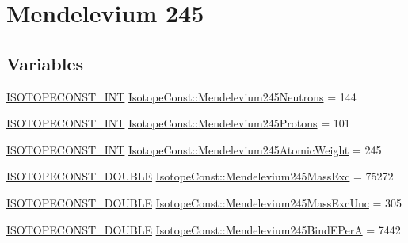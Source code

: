\hypertarget{group___isotope_const-_mendelevium-_md245}{}\section{Mendelevium 245}
\label{group___isotope_const-_mendelevium-_md245}
\subsection*{Variables}
\begin{DoxyCompactItemize}
\item 
\mbox{\hyperlink{group___isotope_const-_macros_ga5f18360b3e99483a35c32d789e62621c}{I\+S\+O\+T\+O\+P\+E\+C\+O\+N\+S\+T\+\_\+\+I\+NT}} \mbox{\hyperlink{group___isotope_const-_mendelevium-_md245_gaf6d702b3f6d6c8c738aa31ececd68d5a}{Isotope\+Const\+::\+Mendelevium245\+Neutrons}} = 144
\item 
\mbox{\hyperlink{group___isotope_const-_macros_ga5f18360b3e99483a35c32d789e62621c}{I\+S\+O\+T\+O\+P\+E\+C\+O\+N\+S\+T\+\_\+\+I\+NT}} \mbox{\hyperlink{group___isotope_const-_mendelevium-_md245_ga973fd4597419b4811d2b14048e3ec661}{Isotope\+Const\+::\+Mendelevium245\+Protons}} = 101
\item 
\mbox{\hyperlink{group___isotope_const-_macros_ga5f18360b3e99483a35c32d789e62621c}{I\+S\+O\+T\+O\+P\+E\+C\+O\+N\+S\+T\+\_\+\+I\+NT}} \mbox{\hyperlink{group___isotope_const-_mendelevium-_md245_gaf616d365d0a048e089cbad421ae89f7b}{Isotope\+Const\+::\+Mendelevium245\+Atomic\+Weight}} = 245
\item 
\mbox{\hyperlink{group___isotope_const-_macros_ga8f45a7272ce02c0b4c65c44636ed719a}{I\+S\+O\+T\+O\+P\+E\+C\+O\+N\+S\+T\+\_\+\+D\+O\+U\+B\+LE}} \mbox{\hyperlink{group___isotope_const-_mendelevium-_md245_gabc759b583a61c4e429667389740dde7f}{Isotope\+Const\+::\+Mendelevium245\+Mass\+Exc}} = 75272
\item 
\mbox{\hyperlink{group___isotope_const-_macros_ga8f45a7272ce02c0b4c65c44636ed719a}{I\+S\+O\+T\+O\+P\+E\+C\+O\+N\+S\+T\+\_\+\+D\+O\+U\+B\+LE}} \mbox{\hyperlink{group___isotope_const-_mendelevium-_md245_gac8f0fe063a56e6e801e653811ef528bf}{Isotope\+Const\+::\+Mendelevium245\+Mass\+Exc\+Unc}} = 305
\item 
\mbox{\hyperlink{group___isotope_const-_macros_ga8f45a7272ce02c0b4c65c44636ed719a}{I\+S\+O\+T\+O\+P\+E\+C\+O\+N\+S\+T\+\_\+\+D\+O\+U\+B\+LE}} \mbox{\hyperlink{group___isotope_const-_mendelevium-_md245_ga6207192986e74acf7e0187cd17af0da1}{Isotope\+Const\+::\+Mendelevium245\+Bind\+E\+PerA}} = 7442

\end{DoxyCompactItemize}
